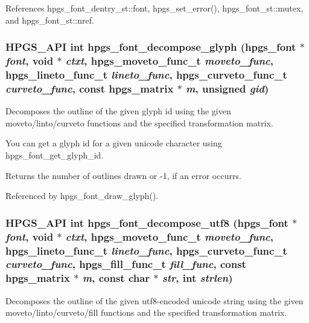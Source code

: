 References hpgs\_\-font\_\-dentry\_\-st::font, hpgs\_\-set\_\-error(), hpgs\_\-font\_\-st::mutex, and hpgs\_\-font\_\-st::nref.

\subsubsection[{hpgs\_\-font\_\-decompose\_\-glyph}]{\setlength{\rightskip}{0pt plus 5cm}HPGS\_\-API int hpgs\_\-font\_\-decompose\_\-glyph ({\bf hpgs\_\-font} $\ast$ {\em font}, \/  void $\ast$ {\em ctxt}, \/  hpgs\_\-moveto\_\-func\_\-t {\em moveto\_\-func}, \/  hpgs\_\-lineto\_\-func\_\-t {\em lineto\_\-func}, \/  hpgs\_\-curveto\_\-func\_\-t {\em curveto\_\-func}, \/  const {\bf hpgs\_\-matrix} $\ast$ {\em m}, \/  unsigned {\em gid})}\label{group__font_gaf1547131b15cfeae35340ceb6f9f9b02}
Decomposes the outline of the given glyph id using the given moveto/linto/curveto functions and the specified transformation matrix.

You can get a glyph id for a given unicode character using {\ttfamily hpgs\_\-font\_\-get\_\-glyph\_\-id}.

Returns the number of outlines drawn or -\/1, if an error occurrs. 

Referenced by hpgs\_\-font\_\-draw\_\-glyph().

\subsubsection[{hpgs\_\-font\_\-decompose\_\-utf8}]{\setlength{\rightskip}{0pt plus 5cm}HPGS\_\-API int hpgs\_\-font\_\-decompose\_\-utf8 ({\bf hpgs\_\-font} $\ast$ {\em font}, \/  void $\ast$ {\em ctxt}, \/  hpgs\_\-moveto\_\-func\_\-t {\em moveto\_\-func}, \/  hpgs\_\-lineto\_\-func\_\-t {\em lineto\_\-func}, \/  hpgs\_\-curveto\_\-func\_\-t {\em curveto\_\-func}, \/  hpgs\_\-fill\_\-func\_\-t {\em fill\_\-func}, \/  const {\bf hpgs\_\-matrix} $\ast$ {\em m}, \/  const char $\ast$ {\em str}, \/  int {\em strlen})}\label{group__font_ga45140e6b77db9167a1e48a606147e3e0}
Decomposes the outline of the given utf8-\/encoded unicode string using the given moveto/linto/curveto/fill functions and the specified transformation matrix.

